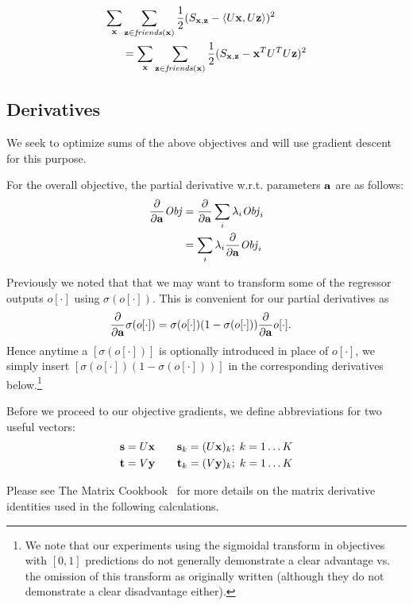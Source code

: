 \begin{align}
\sum_{\mathbf{x}} & \sum_{\mathbf{z} \in \mathit{friends}(\mathbf{x})} \frac{1}{2} (S_{\mathbf{x},\mathbf{z}} - \langle U\mathbf{x}, U\mathbf{z} \rangle)^2 \nonumber \\
& = \sum_{\mathbf{x}} \sum_{\mathbf{z} \in \mathit{friends}(\mathbf{x})} \frac{1}{2} (S_{\mathbf{x},\mathbf{z}} - \mathbf{x}^T U^T U \mathbf{z})^2
\end{align}

\subsection{Derivatives}

We seek to optimize sums of the above objectives and will use
gradient descent for this purpose.  

For the overall objective, the partial derivative 
w.r.t. parameters $\mathbf{a}$ are as follows:
\begin{align*}
\frac{\partial}{\partial \mathbf{a}} \mathit{Obj} & = \frac{\partial}{\partial \mathbf{a}} \sum_i \lambda_i \mathit{Obj}_i\\
& = \sum_i \lambda_i \frac{\partial}{\partial \mathbf{a}} \mathit{Obj}_i \label{eq:sum_der}
\end{align*}

Previously we noted that that we may want to transform
some of the regressor outputs $o[\cdot]$ using $\sigma(o[\cdot])$.  
This is convenient for our partial derivatives as
\begin{align}
 \frac{\partial}{\partial \mathbf{a}}\sigma(o[\cdot]) & = \sigma(o[\cdot]) (1 - \sigma(o[\cdot])) \frac{\partial}{\partial \mathbf{a}} o[\cdot] .
\end{align}
Hence anytime a $[\sigma(o[\cdot])]$ is optionally 
introduced in place of $o[\cdot]$, we simply
insert $[\sigma(o[\cdot]) (1 - \sigma(o[\cdot]))]$ in the corresponding derivatives 
below.\footnote{We note that our experiments using the sigmoidal transform in
objectives with $[0,1]$ predictions do not generally demonstrate a
clear advantage vs. the omission of this transform as originally
written (although they do not demonstrate a clear disadvantage
either).}

Before we proceed to our objective gradients, we define abbreviations
for two useful vectors:
\begin{align*}
\mathbf{s} & = U \mathbf{x} \qquad \mathbf{s}_{k} = (U \mathbf{x})_{k}; \; k=1\ldots K\\
\mathbf{t} & = V \mathbf{y} \qquad \mathbf{t}_{k} = (V \mathbf{y})_{k}; \; k=1\ldots K
\end{align*}

Please see The Matrix Cookbook~\cite{matrix} for more details on the matrix derivative identities used in the following calculations.

